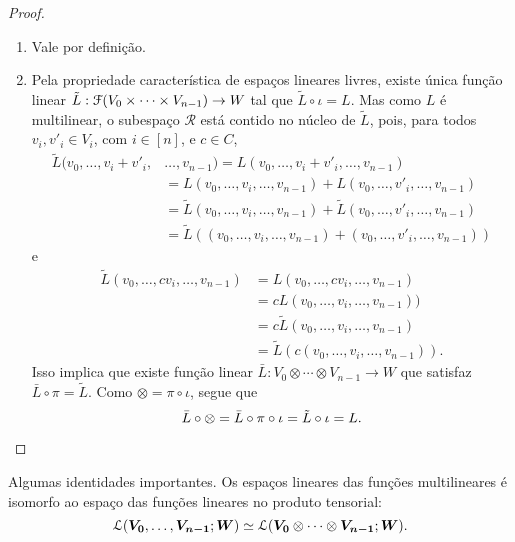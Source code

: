 \begin{proof}
	\begin{enumerate}
	\item Vale por definição.

	\item Pela propriedade característica de espaços lineares livres, existe única função linear $\tilde L: \mathcal{F}(V_0 \times \cdots \times V_{n-1}) \to W$ tal que $\tilde L \circ \iota = L$. Mas como $L$ é multilinear, o subespaço $\mathcal R$ está contido no núcleo de $\tilde L$, pois, para todos $v_i,v'_i \in V_i$, com $i \in [n]$, e $c \in C$,
	\begin{align*}
	\tilde L(v_0,\ldots,v_i+v'_i,&\ldots,v_{n-1}) = L(v_0,\ldots,v_i+v'_i,\ldots,v_{n-1}) \\
		&=L(v_0,\ldots,v_i,\ldots,v_{n-1}) + L(v_0,\ldots,v'_i,\ldots,v_{n-1}) \\
		&=\tilde L(v_0,\ldots,v_i,\ldots,v_{n-1}) + \tilde L(v_0,\ldots,v'_i,\ldots,v_{n-1}) \\
		&=\tilde L((v_0,\ldots,v_i,\ldots,v_{n-1}) + (v_0,\ldots,v'_i,\ldots,v_{n-1}))
	\end{align*}
e
	\begin{align*}
	\tilde L(v_0,\ldots,cv_i,\ldots,v_{n-1}) &= L(v_0,\ldots,cv_i,\ldots,v_{n-1}) \\
		&=cL(v_0,\ldots,v_i,\ldots,v_{n-1})) \\
		&= c\tilde L(v_0,\ldots,v_i,\ldots,v_{n-1}) \\
		&= \tilde L(c(v_0,\ldots,v_i,\ldots,v_{n-1})).
	\end{align*}
Isso implica que existe função linear $\bar L: V_0 \otimes \cdots \otimes V_{n-1} \to W$ que satisfaz $\bar L \circ \pi = \tilde L$. Como $\otimes = \pi \circ \iota$, segue que
	\begin{equation*}
	\bar L \circ \otimes = \bar L \circ \pi \circ \iota = \tilde L \circ \iota = L.
	\qedhere
	\end{equation*}
	\end{enumerate}
\end{proof}

Algumas identidades importantes. Os espaços lineares das funções multilineares é isomorfo ao espaço das funções lineares no produto tensorial:
	\begin{equation*}
	\mathcal{L}(\bm{V_0},\ldots,\bm{V_{n-1}};\bm W) \simeq \mathcal{L}(\bm{V_0} \otimes \cdots \otimes \bm{V_{n-1}};\bm W).
	\end{equation*}


